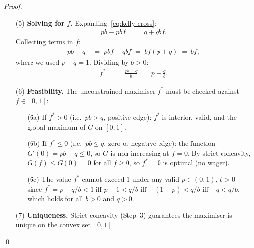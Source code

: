 \documentclass[12pt,openany]{book}
\numberwithin{equation}{chapter}
\theoremstyle{plain}
\theoremstyle{definition}
\theoremstyle{remark}
\numberwithin{equation}{chapter}
\theoremstyle{plain}
\begin{document}
\begin{proof}
\begin{enumerate}
  \item[\textup{(5)}] \textbf{Solving for $f$.}
        Expanding~\eqref{eq:kelly-cross}:
        \begin{align}
          pb - pbf
          &\;=\; q + qbf.
          \label{eq:kelly-expand}
        \end{align}
        Collecting terms in $f$:
        \begin{align}
          pb - q
          &\;=\; pbf + qbf
          \;=\; bf(p + q)
          \;=\; bf,
          \label{eq:kelly-collect}
        \end{align}
        where we used $p + q = 1$.
        Dividing by $b > 0$:
        \begin{align}
          f^*
          &\;=\; \frac{pb - q}{b}
          \;=\; p - \frac{q}{b}.
          \label{eq:kelly-fstar}
        \end{align}

  \item[\textup{(6)}] \textbf{Feasibility.}
        The unconstrained maximiser $f^*$ must be checked
        against $f \in [0,1]$:
        \begin{enumerate}
          \item[\textup{(6a)}] If $f^* > 0$ (i.e.\ $pb > q$,
                positive edge): $f^*$ is interior, valid, and
                the global maximum of $G$ on $[0,1]$.
          \item[\textup{(6b)}] If $f^* \leq 0$ (i.e.\ $pb
                \leq q$, zero or negative edge): the function
                $G'(0) = pb - q \leq 0$, so $G$ is
                non-increasing at $f=0$.  By strict concavity,
                $G(f) \leq G(0) = 0$ for all $f \geq 0$, so
                $f^* = 0$ is optimal (no wager).
          \item[\textup{(6c)}] The value $f^*$ cannot
                exceed $1$ under any valid $p \in (0,1)$,
                $b > 0$ since $f^* = p - q/b < 1$ iff
                $p - 1 < q/b$ iff $-(1-p) < q/b$ iff
                $-q < q/b$, which holds for all $b > 0$
                and $q > 0$.
        \end{enumerate}

  \item[\textup{(7)}] \textbf{Uniqueness.}
        Strict concavity (Step~3) guarantees the maximiser
        is unique on the convex set $[0,1]$.
\end{enumerate}
\qed
\end{proof}
\end{document}
